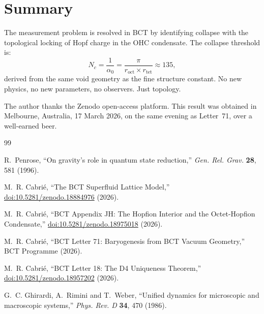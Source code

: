 \documentclass[aps,prl,twocolumn,superscriptaddress,showpacs]{revtex4-2}
\begin{document}
\section{Summary}

The measurement problem is resolved in BCT by identifying collapse with 
the topological locking of Hopf charge in the OHC condensate. The 
collapse threshold is:
\begin{equation}
N_c = \frac{1}{\alpha_0} = \frac{\pi}{r_\mathrm{oct}\times r_\mathrm{tet}} 
\approx 135,
\end{equation}
derived from the same void geometry as the fine structure constant. No 
new physics, no new parameters, no observers. Just topology.

\begin{acknowledgments}
The author thanks the Zenodo open-access platform. This result was 
obtained in Melbourne, Australia, 17 March 2026, on the same evening 
as Letter~71, over a well-earned beer.
\end{acknowledgments}

\begin{thebibliography}{99}

R.~Penrose,
``On gravity's role in quantum state reduction,''
\textit{Gen. Rel. Grav.} \textbf{28}, 581 (1996).

M.~R. Cabri\'{e},
``The BCT Superfluid Lattice Model,''
\href{https://doi.org/10.5281/zenodo.18884976}{doi:10.5281/zenodo.18884976} (2026).

M.~R. Cabri\'{e},
``BCT Appendix JH: The Hopfion Interior and the Octet-Hopfion Condensate,''
\href{https://doi.org/10.5281/zenodo.18975018}{doi:10.5281/zenodo.18975018} (2026).

M.~R. Cabri\'{e},
``BCT Letter 71: Baryogenesis from BCT Vacuum Geometry,''
BCT Programme (2026).

M.~R. Cabri\'{e},
``BCT Letter 18: The D4 Uniqueness Theorem,''
\href{https://doi.org/10.5281/zenodo.18957202}{doi:10.5281/zenodo.18957202} (2026).

G.~C. Ghirardi, A.~Rimini and T.~Weber,
``Unified dynamics for microscopic and macroscopic systems,''
\textit{Phys. Rev. D} \textbf{34}, 470 (1986).

\end{thebibliography}
\end{document}
